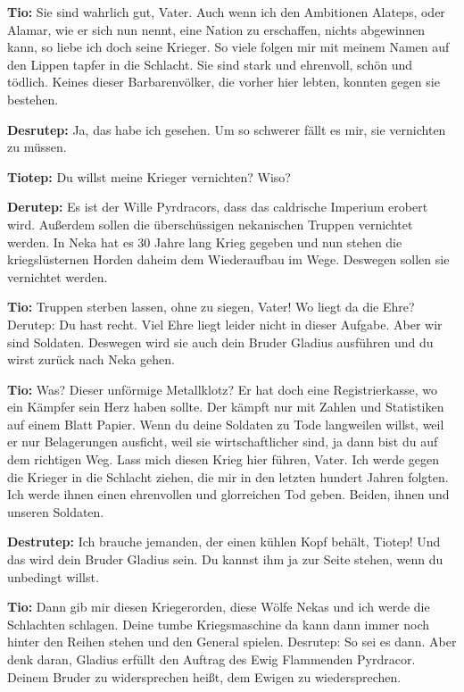 \documentclass[a5paper,6pt]{book}
\begin{document}
\textbf{Tio:} Sie sind wahrlich gut, Vater. Auch wenn ich den Ambitionen Alateps, oder Alamar, wie
er sich nun nennt, eine Nation zu erschaffen, nichts abgewinnen kann, so liebe ich
doch seine Krieger. So viele folgen mir mit meinem Namen auf den Lippen tapfer
in die Schlacht. Sie sind stark und ehrenvoll, schön und tödlich. Keines dieser
Barbarenvölker, die vorher hier lebten, konnten gegen sie bestehen.

\textbf{Desrutep:} Ja, das habe ich gesehen. Um so schwerer fällt es mir, sie vernichten zu müssen.

\textbf{Tiotep:} Du willst meine Krieger vernichten? Wiso?

\textbf{Derutep:} Es ist der Wille Pyrdracors, dass das caldrische Imperium erobert wird. Außerdem
sollen die überschüssigen nekanischen Truppen vernichtet werden. In Neka hat es 30
Jahre lang Krieg gegeben und nun stehen die kriegslüsternen Horden daheim dem
Wiederaufbau im Wege. Deswegen sollen sie vernichtet werden.

\textbf{Tio:} Truppen sterben lassen, ohne zu siegen, Vater! Wo liegt da die Ehre?
Derutep: Du hast recht. Viel Ehre liegt leider nicht in dieser Aufgabe. Aber wir sind Soldaten.
Deswegen wird sie auch dein Bruder Gladius ausführen und du wirst zurück nach
Neka gehen.

\textbf{Tio:} Was? Dieser unförmige Metallklotz? Er hat doch eine Registrierkasse, wo ein Kämpfer
sein Herz haben sollte. Der kämpft nur mit Zahlen und Statistiken auf einem Blatt
Papier. Wenn du deine Soldaten zu Tode langweilen willst, weil er nur Belagerungen
ausficht, weil sie wirtschaftlicher sind, ja dann bist du auf dem richtigen Weg.
Lass mich diesen Krieg hier führen, Vater. Ich werde gegen die Krieger in die
Schlacht ziehen, die mir in den letzten hundert Jahren folgten. Ich werde ihnen einen
ehrenvollen und glorreichen Tod geben. Beiden, ihnen und unseren Soldaten.

\textbf{Destrutep:} Ich brauche jemanden, der einen kühlen Kopf behält, Tiotep! Und das wird dein
Bruder Gladius sein. Du kannst ihm ja zur Seite stehen, wenn du unbedingt willst.

\textbf{Tio:} Dann gib mir diesen Kriegerorden, diese Wölfe Nekas und ich werde die Schlachten
schlagen. Deine tumbe Kriegsmaschine da kann dann immer noch hinter den Reihen
stehen und den General spielen.
Desrutep: So sei es dann. Aber denk daran, Gladius erfüllt den Auftrag des Ewig
Flammenden Pyrdracor. Deinem Bruder zu widersprechen heißt, dem Ewigen zu
wiedersprechen.
\end{document}
